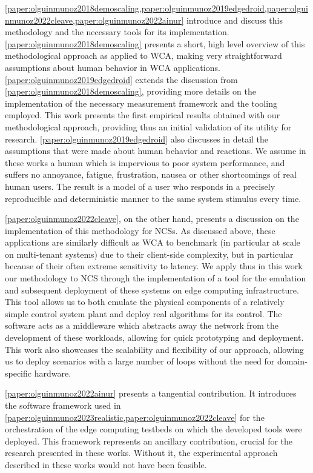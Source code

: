 \cref{paper:olguinmunoz2018demoscaling,paper:olguinmunoz2019edgedroid,paper:olguinmunoz2022cleave,paper:olguinmunoz2022ainur} introduce and discuss this methodology and the necessary tools for its implementation.
\cref{paper:olguinmunoz2018demoscaling} presents a short, high level overview of this methodological approach as applied to \gls{WCA}, making very straightforward assumptions about human behavior in \gls{WCA} applications.
\cref{paper:olguinmunoz2019edgedroid} extends the discussion from \cref{paper:olguinmunoz2018demoscaling}, providing more details on the implementation of the necessary measurement framework and the tooling employed.
This work presents the first empirical results obtained with our methodological approach, providing thus an initial validation of its utility for research.
\cref{paper:olguinmunoz2019edgedroid} also discusses in detail the assumptions that were made about human behavior and reactions.
We assume in these works a human which is impervious to poor system performance, and suffers no annoyance, fatigue, frustration, nausea or other shortcomings of real human users.
The result is a model of a user who responds in a precisely reproducible and deterministic manner to the same system stimulus every time.

\cref{paper:olguinmunoz2022cleave}, on the other hand, presents a discussion on the implementation of this methodology for \glspl{NCS}.
As discussed above, these applications are similarly difficult as \gls{WCA} to benchmark (in particular at scale on multi-tenant systems) due to their client-side complexity, but in particular because of their often extreme sensitivity to latency.
We apply thus in this work our methodology to \gls{NCS} through the implementation of a tool for the emulation and subsequent deployment of these systems on edge computing infrastructure.
This tool allows us to both emulate the physical components of a relatively simple control system plant and deploy real algorithms for its control.
The software acts as a middleware which abstracts away the network from the development of these workloads, allowing for quick prototyping and deployment.
This work also showcases the scalability and flexibility of our approach, allowing us to deploy scenarios with a large number of loops without the need for domain-specific hardware.

\cref{paper:olguinmunoz2022ainur} presents a tangential contribution.
It introduces the software framework used in \cref{paper:olguinmunoz2023realistic,paper:olguinmunoz2022cleave} for the orchestration of the edge computing testbeds on which the developed tools were deployed.
This framework represents an ancillary contribution, crucial for the research presented in these works.
Without it, the experimental approach described in these works would not have been feasible.

